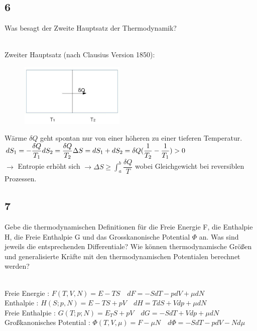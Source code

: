 \documentclass[12pt,a4paper]{report}
\newenvironment{myfrag}{\begin{it}}{\end{it}\vspace{3mm}\par}
\numberwithin{equation}{section}
\begin{document}
\subsection{6}
\begin{myfrag}
Was besagt der Zweite Hauptsatz der Thermodynamik?
\end{myfrag} \quad \\
Zweiter Hauptsatz (nach Clausius Version 1850): \\[2ex]
\begin{figure}
\includegraphics[width=5cm]{Bilder/Frage6.jpg} 
\end{figure}
Wärme $\delta Q$ geht spontan nur von einer höheren zu einer tieferen Temperatur. \\
$dS_1 = - \dfrac{\delta Q}{T_1} \\
dS_2 = \dfrac{\delta Q}{T_2} \\
\Delta S = dS_1 + dS_2 = \delta Q ( \dfrac{1}{T_2} -\dfrac{1}{T_1}) > 0$ \\
$\rightarrow $ Entropie erhöht sich $\rightarrow  \Delta S \geq \int_a^b \dfrac{\delta Q}{T} $ wobei Gleichgewicht bei reversiblen Prozessen.
\subsection{7}
\begin{myfrag}
Gebe die thermodynamischen Definitionen für die Freie Energie F, die
Enthalpie H, die Freie Enthalpie G und das Grosskanonische Potential $\Phi $
an. Was sind jeweils die entsprechenden Differentiale? Wie können
thermodynamische Größen und generalisierte Kräfte mit den
thermodynamischen Potentialen berechnet werden?
\end{myfrag} \quad \\
Freie Energie : $F(T,V,N) = E-TS \quad dF = -SdT -pdV+\mu dN$ \\
Enthalpie : $ H(S;p,N)=E-TS+pV \quad dH = TdS +Vdp+\mu dN$ \\
Freie Enthalpie : $ G(T;p;N)=E_TS+pV \quad dG=-SdT+Vdp+\mu dN$ \\
Großkanonisches Potential : $\Phi(T,V,\mu ) = F-\mu N \quad d \Phi = -SdT-pdV-Nd \mu $ \\[2ex]
\end{document}
